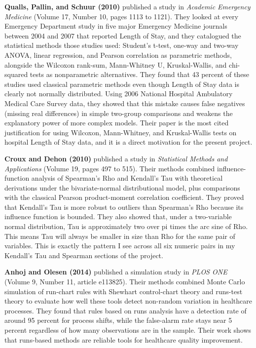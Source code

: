 \documentclass[12pt]{article}
\begin{document}
\textbf{Qualls, Pallin, and Schuur (2010)} published a study in
\textit{Academic Emergency Medicine} (Volume 17, Number 10, pages 1113
to 1121). They looked at every Emergency Department study in five
major Emergency Medicine journals between 2004 and 2007 that reported
Length of Stay, and they catalogued the statistical methods those
studies used: Student's t-test, one-way and two-way ANOVA, linear
regression, and Pearson correlation as parametric methods, alongside
the Wilcoxon rank-sum, Mann-Whitney U, Kruskal-Wallis, and chi-squared
tests as nonparametric alternatives. They found that 43 percent of
these studies used classical parametric methods even though Length of
Stay data is clearly not normally distributed. Using 2006 National
Hospital Ambulatory Medical Care Survey data, they showed that this
mistake causes false negatives (missing real differences) in simple
two-group comparisons and weakens the explanatory power of more
complex models. Their paper is the most cited justification for using
Wilcoxon, Mann-Whitney, and Kruskal-Wallis tests on hospital Length
of Stay data, and it is a direct motivation for the present project.

\textbf{Croux and Dehon (2010)} published a study in
\textit{Statistical Methods and Applications} (Volume 19, pages 497
to 515). Their methods combined influence-function analysis of
Spearman's Rho and Kendall's Tau with theoretical derivations under
the bivariate-normal distributional model, plus comparisons with the
classical Pearson product-moment correlation coefficient. They proved
that Kendall's Tau is more robust to outliers than Spearman's Rho
because its influence function is bounded. They also showed that,
under a two-variable normal distribution, Tau is approximately two
over pi times the arc sine of Rho. This means Tau will always be
smaller in size than Rho for the same pair of variables. This is
exactly the pattern I see across all six numeric pairs in my Kendall's
Tau and Spearman sections of the project.

\textbf{Anhoj and Olesen (2014)} published a simulation study in
\textit{PLOS ONE} (Volume 9, Number 11, article e113825). Their
methods combined Monte Carlo simulation of run-chart rules with
Shewhart control-chart theory and runs-test theory to evaluate how
well these tools detect non-random variation in healthcare processes.
They found that rules based on runs analysis have a detection rate of
around 95 percent for process shifts, while the false-alarm rate stays
near 5 percent regardless of how many observations are in the sample.
Their work shows that runs-based methods are reliable tools for
healthcare quality improvement.
\end{document}
